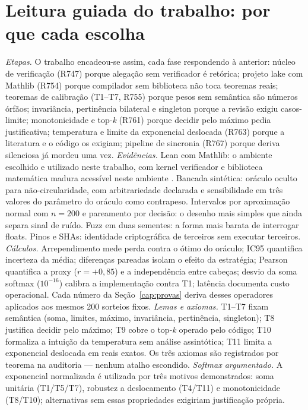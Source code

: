 \section{Leitura guiada do trabalho: por que cada escolha}
\textit{Etapas.} O trabalho encadeou-se assim, cada fase respondendo à anterior: núcleo de verificação (R747) porque alegação sem verificador é retórica; projeto lake com Mathlib (R754) porque compilador sem biblioteca não toca teoremas reais; teoremas de calibração (T1--T7, R755) porque pesos sem semântica são números órfãos; invariância, pertinência bilateral e singleton porque a revisão exigiu casos-limite; monotonicidade e top-\textit{k} (R761) porque decidir pelo máximo pedia justificativa; temperatura e limite da exponencial deslocada (R763) porque a literatura e o código os exigiam; pipeline de sincronia (R767) porque deriva silenciosa já mordeu uma vez.
\textit{Evidências.} Lean com Mathlib: o ambiente escolhido e utilizado neste trabalho, com kernel verificador e biblioteca matemática madura acessível neste ambiente \cite{moura2021,mathlib2020}. Bancada sintética: oráculo oculto para não-circularidade, com arbitrariedade declarada e sensibilidade em três valores do parâmetro do oráculo como contrapeso. Intervalos por aproximação normal com $n=200$ e pareamento por decisão: o desenho mais simples que ainda separa sinal de ruído. Fuzz em duas sementes: a forma mais barata de interrogar floats. Pinos e SHAs: identidade criptográfica de terceiros sem executar terceiros.
\textit{Cálculos.} Arrependimento mede perda contra o ótimo do oráculo; IC95 quantifica incerteza da média; diferenças pareadas isolam o efeito da estratégia; Pearson quantifica a proxy ($r=+0{,}85$) e a independência entre cabeças; desvio da soma softmax ($10^{-16}$) calibra a implementação contra T1; latência documenta custo operacional. Cada número da Seção~\ref{cap:provas} deriva desses operadores aplicados aos mesmos 200 sorteios fixos.
\textit{Lemas e axiomas.} T1--T7 fixam semântica (soma, limites, máximo, invariância, pertinência, singleton); T8 justifica decidir pelo máximo; T9 cobre o top-\textit{k} operado pelo código; T10 formaliza a intuição da temperatura sem análise assintótica; T11 limita a exponencial deslocada em reais exatos. Os três axiomas são registrados por teorema na auditoria --- nenhum atalho escondido.
\textit{Softmax argumentado.} A exponencial normalizada é utilizada por três motivos demonstrados: soma unitária (T1/T5/T7), robustez a deslocamento (T4/T11) e monotonicidade (T8/T10); alternativas sem essas propriedades exigiriam justificação própria.
